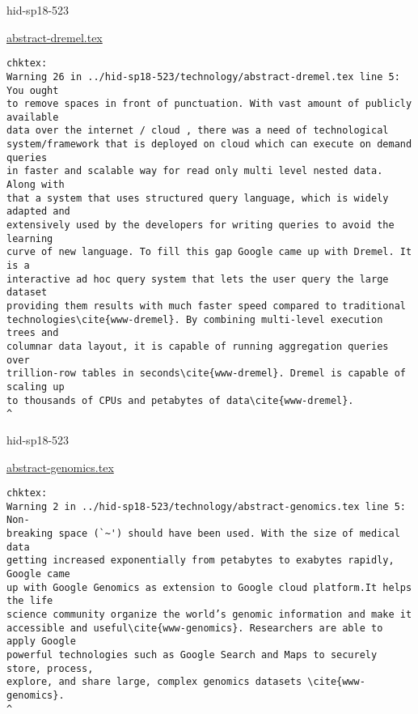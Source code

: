 \begin{IU}

hid-sp18-523

\href{https://github.com/cloudmesh-community/hid-sp18-523/blob/master//technology/abstract-dremel.tex}{abstract-dremel.tex}

\begin{tiny}
\begin{verbatim}
chktex:
Warning 26 in ../hid-sp18-523/technology/abstract-dremel.tex line 5: You ought
to remove spaces in front of punctuation. With vast amount of publicly available
data over the internet / cloud , there was a need of technological
system/framework that is deployed on cloud which can execute on demand queries
in faster and scalable way for read only multi level nested data. Along with
that a system that uses structured query language, which is widely adapted and
extensively used by the developers for writing queries to avoid the learning
curve of new language. To fill this gap Google came up with Dremel. It is a
interactive ad hoc query system that lets the user query the large dataset
providing them results with much faster speed compared to traditional
technologies\cite{www-dremel}. By combining multi-level execution trees and
columnar data layout, it is capable of running aggregation queries over
trillion-row tables in seconds\cite{www-dremel}. Dremel is capable of scaling up
to thousands of CPUs and petabytes of data\cite{www-dremel}.
^
\end{verbatim}
\end{tiny}
\end{IU}



\begin{IU}

hid-sp18-523

\href{https://github.com/cloudmesh-community/hid-sp18-523/blob/master//technology/abstract-genomics.tex}{abstract-genomics.tex}

\begin{tiny}
\begin{verbatim}
chktex:
Warning 2 in ../hid-sp18-523/technology/abstract-genomics.tex line 5: Non-
breaking space (`~') should have been used. With the size of medical data
getting increased exponentially from petabytes to exabytes rapidly, Google came
up with Google Genomics as extension to Google cloud platform.It helps the life
science community organize the world’s genomic information and make it
accessible and useful\cite{www-genomics}. Researchers are able to apply Google
powerful technologies such as Google Search and Maps to securely store, process,
explore, and share large, complex genomics datasets \cite{www-genomics}.
^
\end{verbatim}
\end{tiny}
\end{IU}

